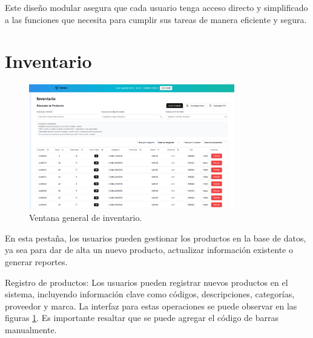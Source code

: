 Este diseño modular asegura que cada usuario tenga acceso directo y simplificado a las funciones que necesita para cumplir sus tareas de manera eficiente y segura. 

 

\section{Inventario}
\begin{figure}[ht!]
\centering
\includegraphics[width=0.8\textwidth]{imgs/Almacen_General/inventario/inventario_1_general.png}
\caption{Ventana general de inventario.}
\label{fig:inventory}
\end{figure}

\begin{justify}
En esta pestaña, los usuarios pueden gestionar los productos en la base de datos, ya sea para dar de alta un nuevo producto, actualizar información existente o generar reportes.
\end{justify}
\begin{justify}
Registro de productos: Los usuarios pueden registrar nuevos productos en el sistema, incluyendo información clave como códigos, descripciones, categorías, proveedor y marca. La interfaz para estas operaciones se puede observar en las figuras \ref{fig:inventory}. Es importante resaltar que se puede agregar el código de barras manualmente. 
\end{justify}




